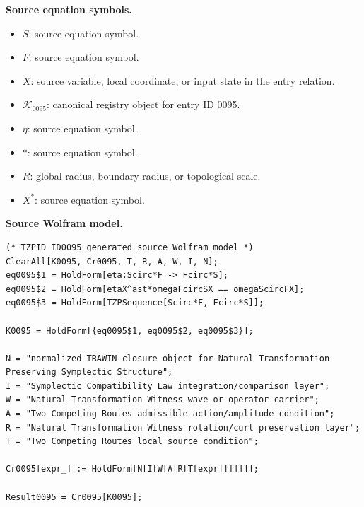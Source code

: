 \begin{minipage}[t]{0.49\linewidth}
\begingroup
\small
\raggedright
\textbf{Source equation symbols.}\par
\begin{itemize}[leftmargin=1.35em,itemsep=1pt,topsep=1pt,parsep=0pt]
    \item $S$: source equation symbol.
    \item $F$: source equation symbol.
    \item $X$: source variable, local coordinate, or input state in the entry relation.
    \item $\mathcal{K}_{0095}$: canonical registry object for entry ID 0095.
    \item $\eta$: source equation symbol.
    \item $\ast$: source equation symbol.
    \item $R$: global radius, boundary radius, or topological scale.
    \item $X^{\ast}$: source equation symbol.
\end{itemize}
\endgroup
\end{minipage}\hfill
\begin{minipage}[t]{0.47\linewidth}
\begingroup
\scriptsize
\raggedright
\textbf{Source Wolfram model.}\par
\begin{Verbatim}[fontsize=\tiny,breaklines=true,breakanywhere=true]
(* TZPID ID0095 generated source Wolfram model *)
ClearAll[K0095, Cr0095, T, R, A, W, I, N];
eq0095$1 = HoldForm[eta:Scirc*F -> Fcirc*S];
eq0095$2 = HoldForm[etaX^ast*omegaFcircSX == omegaScircFX];
eq0095$3 = HoldForm[TZPSequence[Scirc*F, Fcirc*S]];

K0095 = HoldForm[{eq0095$1, eq0095$2, eq0095$3}];

N = "normalized TRAWIN closure object for Natural Transformation Preserving Symplectic Structure";
I = "Symplectic Compatibility Law integration/comparison layer";
W = "Natural Transformation Witness wave or operator carrier";
A = "Two Competing Routes admissible action/amplitude condition";
R = "Natural Transformation Witness rotation/curl preservation layer";
T = "Two Competing Routes local source condition";

Cr0095[expr_] := HoldForm[N[I[W[A[R[T[expr]]]]]]];

Result0095 = Cr0095[K0095];
\end{Verbatim}
\endgroup
\end{minipage}

